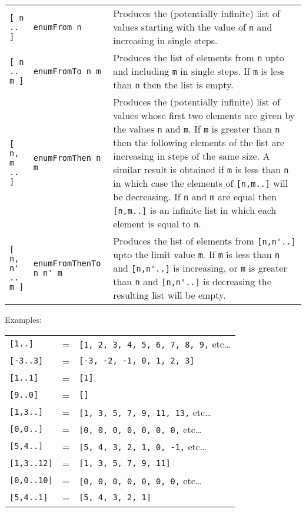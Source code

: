 \begin{tabular}{llp{6cm}}
    \verb"[ n .. ]"&         \verb"enumFrom n" &
                     Produces the (potentially infinite) list of values
                     starting with the value of  \verb"n" and  increasing  in
                     single steps.\\
    \verb"[ n .. m ]"&       \verb"enumFromTo n m"&
                     Produces the list of  elements  from  \verb"n" upto  and
                     including \verb"m" in single steps.
                     If \verb"m" is less than \verb"n"
                     then the list is empty.\\
    \verb"[ n, m .. ]"&      \verb"enumFromThen n m"&
                     Produces the (potentially infinite) list of values
                     whose first two elements are given by the values \verb"n"
                     and \verb"m".  If \verb"m"
                     is greater than \verb"n" then the  following
                     elements of the list are increasing  in  steps  of
                     the same size.  A similar result is obtained if  \verb"m"
                     is less than \verb"n" in  which  case  the  elements  of
                     \verb"[n,m..]" will be decreasing.  
                     If \verb"n" and \verb"m" are  equal
                     then \verb"[n,m..]" is an infinite  list  in  which  each
                     element is equal to \verb"n".\\
    \verb"[ n, n' .. m ]"&   \verb"enumFromThenTo n n' m"&
                     Produces the list of elements from  \verb"[n,n'..]" upto
                     the limit value \verb"m".
                     If  \verb"m" is  less  than  \verb"n" and
                     \verb"[n,n'..]" is increasing, or \verb"m"
                     is greater than \verb"n" and
                     \verb"[n,n'..]" is decreasing the resulting list will be
                     empty.
\end{tabular}
\EQ
Examples:
\BQ
\begin{tabular}{lcl}
    {\tt [1..]    }& = & {\tt [1, 2, 3, 4, 5, 6, 7, 8, 9,} etc\dots\\
    {\tt [-3..3]  }& = & {\tt [-3, -2, -1, 0, 1, 2, 3]}\\
    {\tt [1..1]   }& = & {\tt [1]}\\
    {\tt [9..0]   }& = & {\tt []}\\
    {\tt [1,3..]  }& = & {\tt [1, 3, 5, 7, 9, 11, 13,} etc\dots\\
    {\tt [0,0..]  }& = & {\tt [0, 0, 0, 0, 0, 0, 0,} etc\dots\\
    {\tt [5,4..]  }& = & {\tt [5, 4, 3, 2, 1, 0, -1,} etc\dots\\
    {\tt [1,3..12]}& = & {\tt [1, 3, 5, 7, 9, 11]}\\
    {\tt [0,0..10]}& = & {\tt [0, 0, 0, 0, 0, 0, 0,} etc\dots\\
    {\tt [5,4..1] }& = & {\tt [5, 4, 3, 2, 1]}
\end{tabular}
